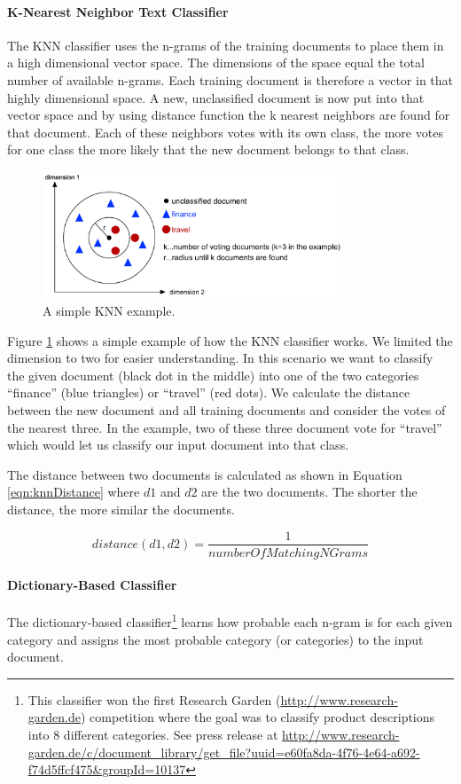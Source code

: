 \documentclass[a4paper,twoside]{book}      %
\begin{document}
\paragraph{K-Nearest Neighbor Text Classifier}
The KNN classifier uses the n-grams of the training documents to place them in a high dimensional vector space. The dimensions of the space equal the total number of available n-grams. Each training document is therefore a vector in that highly dimensional space. A new, unclassified document is now put into that vector space and by using distance function the k nearest neighbors are found for that document. Each of these neighbors votes with its own class, the more votes for one class the more likely that the new document belongs to that class.

\begin{figure}[ht!]
\centering
\includegraphics[width=0.8\textwidth]{img/knn.pdf}
\caption{A simple KNN example.}
\label{fig:knn}
\end{figure}

Figure \ref{fig:knn} shows a simple example of how the KNN classifier works. We limited the dimension to two for easier understanding. In this scenario we want to classify the given document (black dot in the middle) into one of the two categories ``finance'' (blue triangles) or ``travel'' (red dots). We calculate the distance between the new document and all training documents and consider the votes of the nearest three. In the example, two of these three document vote for ``travel'' which would let us classify our input document into that class.

The distance between two documents is calculated as shown in Equation \ref{eqn:knnDistance} where $d1$ and $d2$ are the two documents. The shorter the distance, the more similar the documents.

\begin{equation}
\label{eqn:knnDistance}
distance(d1,d2) = \frac{1}{numberOfMatchingNGrams}
\end{equation}

\paragraph{Dictionary-Based Classifier}
The dictionary-based classifier\footnote{This classifier won the first Research Garden (\url{http://www.research-garden.de}) competition where the goal was to classify product descriptions into 8 different categories. See press release at \url{http://www.research-garden.de/c/document_library/get_file?uuid=e60fa8da-4f76-4e64-a692-f74d5ffcf475&groupId=10137}} learns how probable each n-gram is for each given category and assigns the most probable category (or categories) to the input document.
\end{document}
